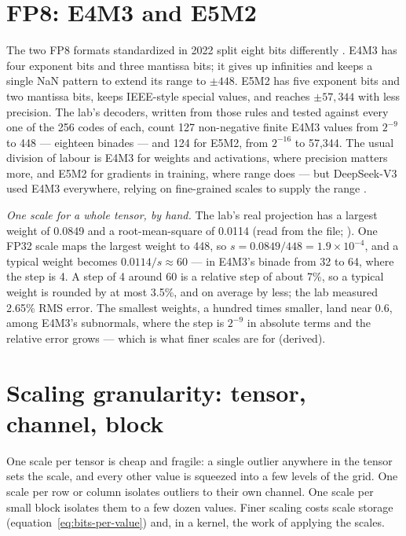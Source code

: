 \section{FP8: E4M3 and E5M2}

The two FP8 formats standardized in 2022 split eight bits differently
\cite{micikevicius2022fp8}. E4M3 has four exponent bits and three mantissa
bits; it gives up infinities and keeps a single NaN pattern to extend its
range to $\pm448$. E5M2 has five exponent bits and two mantissa bits, keeps
IEEE-style special values, and reaches $\pm57{,}344$ with less precision. The
lab's decoders, written from those rules and tested against every one of the
256 codes of each, count 127 non-negative finite E4M3 values from $2^{-9}$ to
448 --- eighteen binades --- and 124 for E5M2, from $2^{-16}$ to 57,344. The
usual division of labour is E4M3 for weights and activations, where precision
matters more, and E5M2 for gradients in training, where range does --- but
DeepSeek-V3 used E4M3 everywhere, relying on fine-grained scales to supply the
range \cite{deepseek2024v3}.

\emph{One scale for a whole tensor, by hand.} The lab's real projection has a
largest weight of 0.0849 and a root-mean-square of 0.0114 (read from the file;
). One FP32 scale maps the largest weight to 448, so
$s = 0.0849/448 = 1.9 \times 10^{-4}$, and a typical weight becomes
$0.0114/s \approx 60$ --- in E4M3's binade from 32 to 64, where the step is 4. A
step of 4 around 60 is a relative step of about 7\%, so a typical weight is
rounded by at most 3.5\%, and on average by less; the lab measured 2.65\% RMS
error. The smallest weights, a hundred times smaller, land near 0.6, among E4M3's
subnormals, where the step is $2^{-9}$ in absolute terms and the relative error
grows --- which is what finer scales are for (derived).

\section{Scaling granularity: tensor, channel, block}

One scale per tensor is cheap and fragile: a single outlier anywhere in the
tensor sets the scale, and every other value is squeezed into a few levels of
the grid. One scale per row or column isolates outliers to their own channel.
One scale per small block isolates them to a few dozen values. Finer scaling
costs scale storage (equation~\eqref{eq:bits-per-value}) and, in a kernel,
the work of applying the scales.


